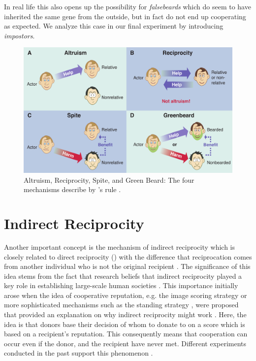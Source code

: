 \documentclass[sigconf]{acmart}
\newcommand{\impostors}{\textit{impostors}\xspace}
\begin{document}
    In real life this also opens up the possibility for \textit{falsebeards} which do seem to have inherited the same gene from the outside, but in fact do not end up cooperating as expected.
    We analyze this case in our final experiment by introducing \impostors.

    \begin{figure}
        \includegraphics[width=\columnwidth]{figures/mechanisms}
        \caption{Altruism, Reciprocity, Spite, and Green Beard: The four mechanisms describe by \citeauthor{hamilton_kin_1964}'s rule \cite{west_altruism_2010}.}
        \label{fig:mechanisms}
    \end{figure}


    \section{Indirect Reciprocity}\label{sec:indirect_reciprocity}
    Another important concept is the mechanism of indirect reciprocity which is closely related to direct reciprocity () with the difference that reciprocation comes from another individual who is not the original recipient \cite{alexander_biology_1987,boyd_evolution_1989}.
    The significance of this idea stems from the fact that research beliefs that indirect reciprocity played a key role in establishing large-scale human societies \cite{roberts_kin_2019}.
    This importance initially arose when the idea of cooperative reputation, e.g. the image scoring strategy or more sophisticated mechanisms such as the standing strategy \cite{leimar_evolution_2001,ohtsuki_leading_2006}, were proposed that provided an explanation on why indirect reciprocity might work \cite{nowak_evolution_1998}.
    Here, the idea is that donors base their decision of whom to donate to on a score which is based on a recipient's reputation.
    This consequently means that cooperation can occur even if the donor, and the recipient have never met.
    Different experiments conducted in the past support this phenomenon \cite{nowak_five_2006, milinski_cooperation_2002, milinski_reputation_2002,milinski_reputation_2016}.
\end{document}
